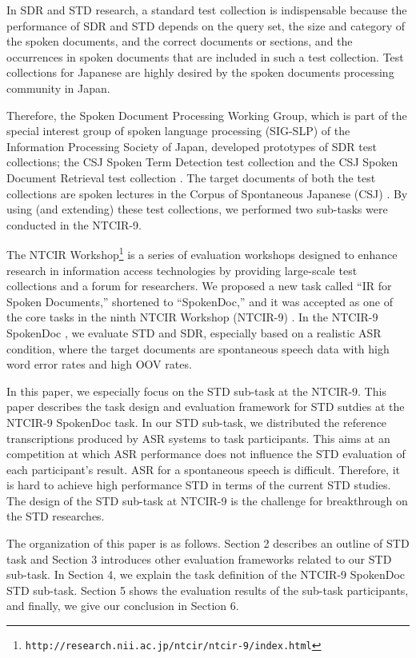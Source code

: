 \documentclass[english]{jnlp_1.4}
\begin{document}
In SDR and STD research, a standard test collection is indispensable
because the performance of SDR and STD depends on the query set, the
size and category of the spoken documents, and the correct documents or
sections, and the occurrences in spoken documents that are included in
such a test collection. 
Test collections for Japanese are highly desired by the spoken documents
processing community in Japan.

Therefore, the Spoken Document Processing Working Group, which is part
of the special interest group of spoken language processing (SIG-SLP) of
the Information Processing Society of Japan, developed
prototypes of SDR test collections; the CSJ Spoken Term Detection test
collection \cite{Itoh2010IS} and the CSJ Spoken Document Retrieval test
    collection \cite{Akiba2009IPSJ}. 
The target documents of both the test collections are spoken lectures in
the Corpus of Spontaneous Japanese (CSJ) \cite{CSJ}. 
By using (and extending) these test collections, we performed two
sub-tasks were conducted in the NTCIR-9.

The NTCIR Workshop\footnote{\texttt{http://research.nii.ac.jp/ntcir/ntcir-9/index.html}} 
is a series of evaluation workshops designed to
enhance research in information access technologies by providing
large-scale test collections and a forum for researchers. 
We proposed a new task called ``IR for Spoken Documents,'' shortened to
``SpokenDoc,'' and it was accepted as one of the core tasks in the ninth
NTCIR Workshop (NTCIR-9) \cite{NTCIR9overview}. 
In the NTCIR-9 SpokenDoc \cite{NTCIR9SpokenDoc}, we evaluate STD and SDR,
especially based on a realistic ASR condition, where the target
documents are spontaneous speech data with high word error rates and high
OOV rates. 

In this paper, we especially focus on the STD sub-task at the NTCIR-9. 
This paper describes the task design and evaluation framework for STD
sutdies at the NTCIR-9 SpokenDoc task.
In our STD sub-task, we distributed the reference transcriptions
produced by ASR systems to task participants. This aims at an
competition at which ASR performance does not influence the STD
evaluation of each participant's result.
ASR for a spontaneous speech is difficult. Therefore, it is hard to
achieve high performance STD in terms of the current STD
studies. The design of the STD sub-task at NTCIR-9 is the challenge for
breakthrough on the STD researches. 


The organization of this paper is as follows. 
Section 2 describes an outline of STD task and Section 3 introduces 
other evaluation frameworks related to our STD sub-task.
In Section 4, we explain the task definition of the NTCIR-9 SpokenDoc
STD sub-task. Section 5 shows the evaluation results of the sub-task
participants, and finally, we give our conclusion in Section 6.
\end{document}
